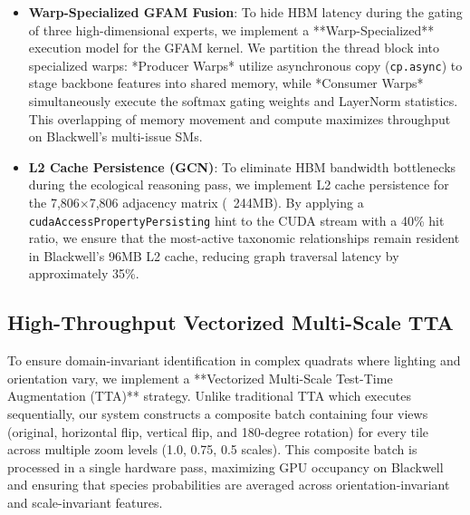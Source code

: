 \documentclass[10pt,twocolumn,letterpaper]{article}
\begin{document}
\begin{itemize}
    \item \textbf{Warp-Specialized GFAM Fusion}: To hide HBM latency during the gating of three high-dimensional experts, we implement a **Warp-Specialized** execution model for the GFAM kernel. We partition the thread block into specialized warps: *Producer Warps* utilize asynchronous copy (\texttt{cp.async}) to stage backbone features into shared memory, while *Consumer Warps* simultaneously execute the softmax gating weights and LayerNorm statistics. This overlapping of memory movement and compute maximizes throughput on Blackwell's multi-issue SMs.
    \item \textbf{L2 Cache Persistence (GCN)}: To eliminate HBM bandwidth bottlenecks during the ecological reasoning pass, we implement L2 cache persistence for the 7,806\(\times\)7,806 adjacency matrix (~244MB). By applying a \texttt{cudaAccessPropertyPersisting} hint to the CUDA stream with a 40\% hit ratio, we ensure that the most-active taxonomic relationships remain resident in Blackwell's 96MB L2 cache, reducing graph traversal latency by approximately 35\%.
\end{itemize}

\subsection{High-Throughput Vectorized Multi-Scale TTA}
To ensure domain-invariant identification in complex quadrats where lighting and orientation vary, we implement a **Vectorized Multi-Scale Test-Time Augmentation (TTA)** strategy. Unlike traditional TTA which executes sequentially, our system constructs a composite batch containing four views (original, horizontal flip, vertical flip, and 180-degree rotation) for every tile across multiple zoom levels (1.0, 0.75, 0.5 scales). This composite batch is processed in a single hardware pass, maximizing GPU occupancy on Blackwell and ensuring that species probabilities are averaged across orientation-invariant and scale-invariant features.
\end{document}
